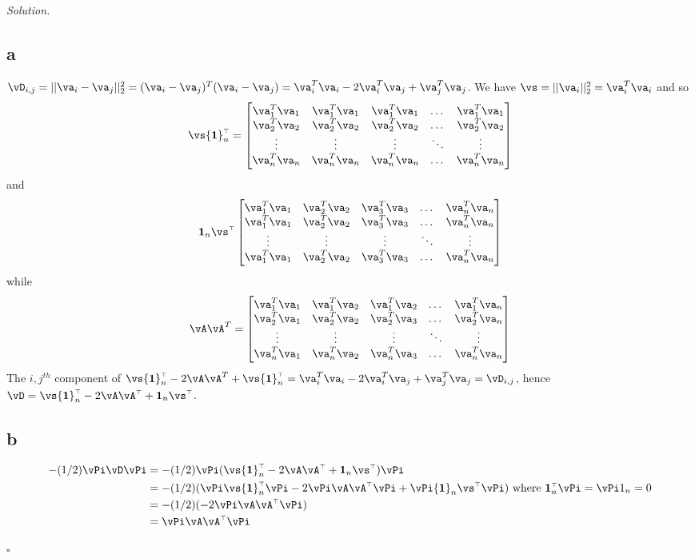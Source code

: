 \documentclass[11pt]{article}
\renewcommand\v[1]{{\ensuremath{\boldsymbol{#1}}}}
\renewcommand\t{{\ensuremath{\scriptscriptstyle{\top}}}}
\theoremstyle{definition}
\newenvironment{solution}{\noindent\emph{Solution.}}{\hfill$\square$}
\begin{document}
\begin{solution}
\subsection*{a}
$\vD_{i,j} = ||\va_i - \va_j||_2^2 = (\va_i - \va_j)^T (\va_i - \va_j) = \va_i^T \va_i - 2 \va_i^T \va_j + \va_j^T \va_j$. We have $\vs = ||\va_i||_2^2 = \va_i^T \va_i$ and so
\[
\vs\v1_n^\t = 
\begin{bmatrix}
    \va_1^T \va_1 & \va_1^T \va_1 & \va_1^T \va_1 & \dots  & \va_1^T \va_1 \\
    \va_2^T \va_2 & \va_2^T \va_2 & \va_2^T \va_2 & \dots  & \va_2^T \va_2 \\
    \vdots & \vdots & \vdots & \ddots & \vdots \\
    \va_n^T \va_n & \va_n^T \va_n & \va_n^T \va_n & \dots  & \va_n^T \va_n
\end{bmatrix}
\] 
and 
\[
\v1_n\vs^\t
\begin{bmatrix}
    \va_1^T \va_1 & \va_2^T \va_2 & \va_3^T \va_3 & \dots  & \va_n^T \va_n \\
    \va_1^T \va_1 & \va_2^T \va_2 & \va_3^T \va_3 & \dots  & \va_n^T \va_n \\
    \vdots & \vdots & \vdots & \ddots & \vdots \\
    \va_1^T \va_1 & \va_2^T \va_2 & \va_3^T \va_3 & \dots  & \va_n^T \va_n
\end{bmatrix}
\] 
while 
\[
\vA\vA^T=
\begin{bmatrix}
    \va_1^T \va_1 & \va_1^T \va_2 & \va_1^T \va_2 & \dots  & \va_1^T \va_n \\
    \va_2^T \va_1 & \va_2^T \va_2 & \va_2^T \va_3 & \dots  & \va_2^T \va_n \\
    \vdots & \vdots & \vdots & \ddots & \vdots \\
    \va_n^T \va_1 & \va_n^T \va_2 & \va_n^T \va_3 & \dots  & \va_n^T \va_n
\end{bmatrix}
\]
The ${i,j}^{th}$ component of $\vs\v1_n^\t - 2 \vA\vA^T + \vs\v1_n^\t = \va_i^T \va_i - 2 \va_i^T \va_j + \va_j^T \va_j = \vD_{i,j}$, hence $\vD = \vs\v1_n^\t - 2\vA\vA^\t + \v1_n\vs^\t$.

\subsection*{b}
\begin{align*}
-(1/2)\vPi\vD\vPi
&= -(1/2)\vPi(\vs\v1_n^\t - 2\vA\vA^\t + \v1_n\vs^\t)\vPi \\
&= -(1/2) (\vPi\vs\v1_n^\t\vPi - 2\vPi\vA\vA^\t\vPi + \vPi\v1_n\vs^\t \vPi) \textrm{ where } \v1_n^\t\vPi = \vPi 1_n = 0\\
&= -(1/2) (- 2\vPi\vA\vA^\t\vPi) \\
&= \vPi\vA\vA^\t\vPi
\end{align*}


\end{solution}
\end{document}
